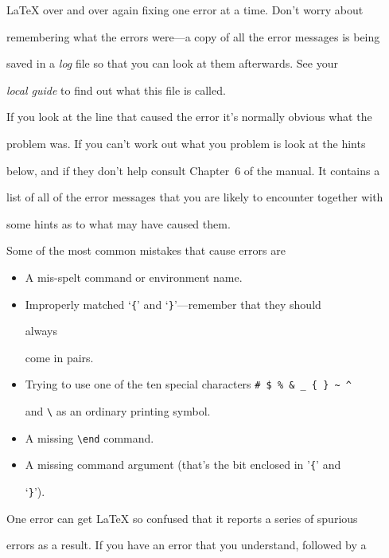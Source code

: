 \LaTeX{} over and over again fixing one error at a time. Don't worry about

remembering what the errors were---a copy of all the error messages is being

saved in a {\em log\/} file so that you can look at them afterwards.  See your

{\em local guide\/} to find out what this file is called.



If you look at the line that caused the error it's normally obvious what the

problem was.  If you can't work out what you problem is look at the hints

below, and if they don't help consult Chapter~6 of the manual.  It contains a

list of all of the error messages that you are likely to encounter together with

some hints as to what may have caused them.



Some of the most common mistakes that cause errors are

\begin{itemize}

\item A mis-spelt command or environment name.

\item Improperly matched `\verb|{|' and `\verb|}|'---remember that they should

 always

come in pairs.

\item Trying to use one of the ten special characters \verb|# $ % & _ { } ~ ^|

and \verb|\| as an ordinary printing symbol.

\item A missing \verb|\end| command.

\item A missing command argument (that's the bit enclosed in '\verb|{|' and

`\verb|}|').

\end{itemize}



One error can get \LaTeX{} so confused that it reports a series of spurious

errors as a result.  If you have an error that you understand, followed by a

